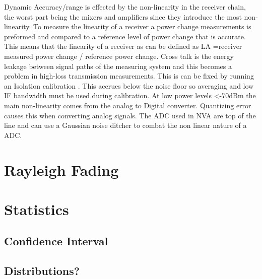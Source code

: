 Dynamic Accuracy/range is effected by the non-linearity in the receiver chain, the worst part being the mixers and amplifiers since they introduce the most non-linearity. To measure the linearity of a receiver a power change measurements is preformed and compared to a reference level of power change that is accurate. This means that the linearity of a receiver as can be defined as LA =receiver measured power change / reference power change.
Cross talk is the energy leakage between signal paths of the measuring system and this becomes a problem in high-loss transmission measurements. This is can be fixed by running an Isolation calibration \citep{crosstalk}. This accrues below the noise floor so averaging and low IF bandwidth must be used during calibration.
At low power levels <-70dBm the main non-linearity comes from the analog to Digital converter. Quantizing error causes this when converting analog signals. The ADC used in NVA are top of the line and can use a Gaussian noise ditcher to combat the non linear nature of a ADC. 

\section{Rayleigh Fading}
\section{Statistics}
\subsection{Confidence Interval}
\subsection{Distributions?}